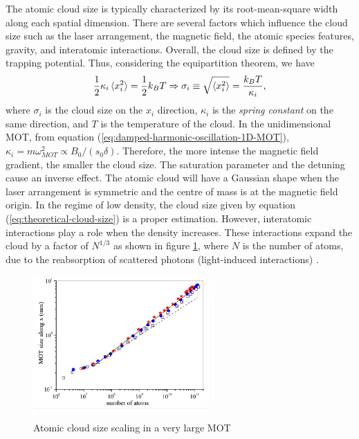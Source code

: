 The atomic cloud size is typically characterized by its root-mean-square width along each spatial dimension. There are several factors which influence the cloud size such as the laser arrangement, the magnetic field, the atomic species features, gravity, and interatomic interactions. Overall, the cloud size is defined by the trapping potential. Thus, considering the equipartition theorem, we have
\begin{equation}
	\frac{1}{2} \kappa_{i} \braket{x_i^2} = \frac{1}{2}k_B T
	\Rightarrow \sigma_{i} \equiv \sqrt{\braket{x_i^2}} = \frac{k_B T}{\kappa_{i}} ,
	\label{eq:theoretical-cloud-size}
\end{equation}
where $ \sigma_{i} $ is the cloud size on the $ x_i $ direction, $ \kappa_{i} $ is the \textit{spring constant} on the same direction, and $ T $ is the temperature of the cloud. In the unidimensional MOT, from equation (\ref{eq:damped-harmonic-oscillation-1D-MOT}), $ \kappa_{i} = m\omega_{MOT}^2 \propto B_0 / (s_0 \delta)$. Therefore, the more intense the magnetic field gradient, the smaller the cloud size. The saturation parameter and the detuning cause an inverse effect. The atomic cloud will have a Gaussian shape when the laser arrangement is symmetric and the centre of mass is at the magnetic field origin. In the regime of low density, the cloud size given by equation (\ref{eq:theoretical-cloud-size}) is a proper estimation. However, interatomic interactions play a role when the density increases. These interactions expand the cloud by a factor of $ N^{1/3} $ as shown in figure \ref{fig:cloud-size-scaling}, where $ N $ is the number of atoms, due to the reabsorption of scattered photons (light-induced interactions) \cite{PhysRevA.90.063404}.

\begin{figure}[!ht]
    \centering
    \caption{Atomic cloud size scaling in a very large MOT}
    \includegraphics[width=0.6\textwidth]{USPSC-img/atomic-cloud-size-scaling.png}
    \label{fig:cloud-size-scaling}
    \vspace{-20pt}
\end{figure}

